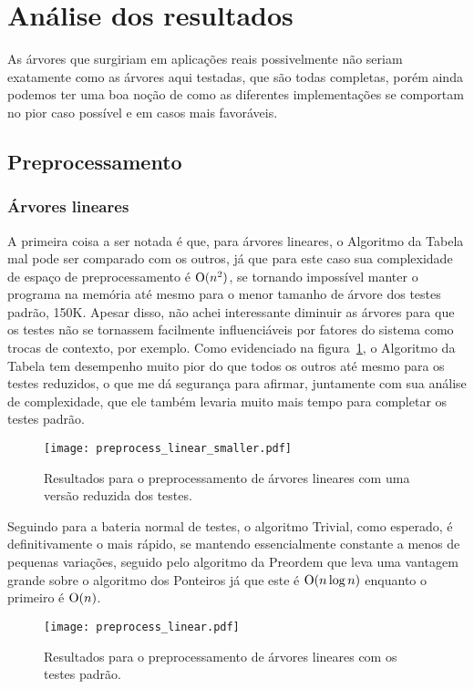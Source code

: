 \section{Análise dos resultados}
As árvores que surgiriam em aplicações reais possivelmente não seriam exatamente como
as árvores aqui testadas, que são todas completas, porém ainda podemos ter uma boa
noção de como as diferentes implementações se comportam no pior caso possível e em casos
mais favoráveis.

\subsection{Preprocessamento}

\subsubsection{Árvores lineares}
A primeira coisa a ser notada é que, para árvores lineares, o Algoritmo da Tabela mal
pode ser comparado com os outros, já que para este caso sua complexidade de espaço
de preprocessamento é $\mathrm{O}(n^2)$, se tornando impossível manter o programa na memória
até mesmo para o menor tamanho de árvore dos testes padrão, 150K. Apesar disso, não
achei interessante diminuir as árvores para que os testes não se tornassem facilmente
influenciáveis por fatores do sistema como trocas de contexto, por exemplo. Como
evidenciado na figura~\ref{fig:proclinearsmall}, o Algoritmo da Tabela tem desempenho
muito pior do que todos os outros até mesmo para os testes reduzidos, o que me dá
segurança para afirmar, juntamente com sua análise de complexidade, que ele também
levaria muito mais tempo para completar os testes padrão.

\begin{figure}
  \texttt{[image: preprocess\_linear\_smaller.pdf]}
  \caption{Resultados para o preprocessamento de árvores lineares com uma versão
  reduzida dos testes.}
  \label{fig:proclinearsmall}
\end{figure}

Seguindo para a bateria normal de testes, o algoritmo Trivial, como esperado, é
definitivamente o mais rápido, se mantendo essencialmente constante a menos de pequenas
variações, seguido pelo algoritmo da Preordem que leva uma vantagem grande sobre o
algoritmo dos Ponteiros já que este é $\mathrm{O}(n \log n)$ enquanto o primeiro é $\mathrm{O}(n)$.

\begin{figure}
  \texttt{[image: preprocess\_linear.pdf]}
  \caption{Resultados para o preprocessamento de árvores lineares com os testes padrão.}
\end{figure}

